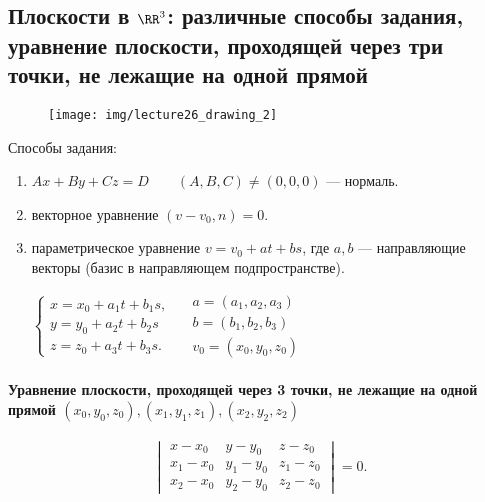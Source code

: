 \subsection{Плоскости в $\RR^3$: различные способы задания, уравнение плоскости, проходящей через три точки, не лежащие на одной прямой}

\begin{wrapfigure}{r}{4.5cm}
    \texttt{[image: img/lecture26\_drawing\_2]}
    \vspace{-30pt}
\end{wrapfigure}

Способы задания:

\begin{enumerate}
    \item $Ax + By + Cz = D \quad\quad(A, B, C) \neq (0, 0, 0)$ --- нормаль.
    \item векторное уравнение $(v - v_0, n) = 0$.
    \item параметрическое уравнение $v = v_0 + at + bs$, где $a, b$ --- направляющие векторы (базис в направляющем подпространстве).
    
    \begin{math}
        \begin{cases}
            x = x_0 + a_1 t + b_1 s, \\
            y = y_0 + a_2 t + b_2 s \\
            z = z_0 + a_3 t + b_3 s.
        \end{cases} \quad
        \begin{gathered}
            a = (a_1, a_2, a_3) \\
            b = (b_1, b_2, b_3) \\
            v_0 = (x_0, y_0, z_0)
        \end{gathered}
    \end{math}

\end{enumerate}

\paragraph{Уравнение плоскости, проходящей через 3 точки, не лежащие на одной прямой $(x_0, y_0, z_0), (x_1, y_1, z_1), (x_2, y_2, z_2)$}

\begin{equation*}
    \begin{vmatrix} 
        x - x_0 & y - y_0 & z - z_0 \\
        x_1 - x_0 & y_1 - y_0 & z_1 - z_0 \\
        x_2 - x_0 & y_2 - y_0 & z_2 - z_0
    \end{vmatrix} = 0
.\end{equation*}


